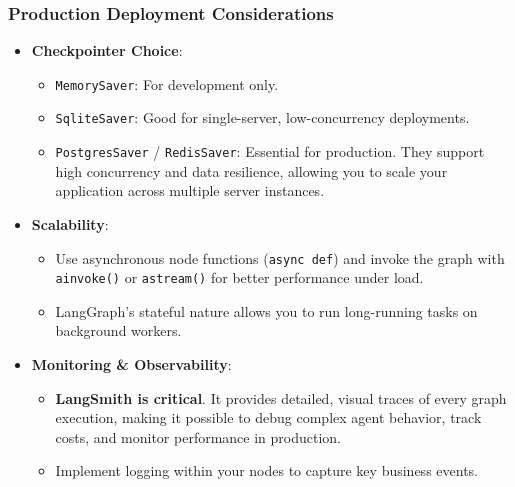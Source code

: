 \begin{frame}[fragile]\frametitle{Production Deployment Considerations}
      \begin{itemize}
        \item \textbf{Checkpointer Choice}:
        \begin{itemize}
            \item \texttt{MemorySaver}: For development only.
            \item \texttt{SqliteSaver}: Good for single-server, low-concurrency deployments.
            \item \texttt{PostgresSaver} / \texttt{RedisSaver}: Essential for production. They support high concurrency and data resilience, allowing you to scale your application across multiple server instances.
        \end{itemize}
        \item \textbf{Scalability}:
        \begin{itemize}
            \item Use asynchronous node functions (\texttt{async def}) and invoke the graph with \texttt{ainvoke()} or \texttt{astream()} for better performance under load.
            \item LangGraph's stateful nature allows you to run long-running tasks on background workers.
        \end{itemize}
        \item \textbf{Monitoring \& Observability}:
        \begin{itemize}
            \item \textbf{LangSmith is critical}. It provides detailed, visual traces of every graph execution, making it possible to debug complex agent behavior, track costs, and monitor performance in production.
            \item Implement logging within your nodes to capture key business events.
        \end{itemize}
      \end{itemize}
\end{frame}

